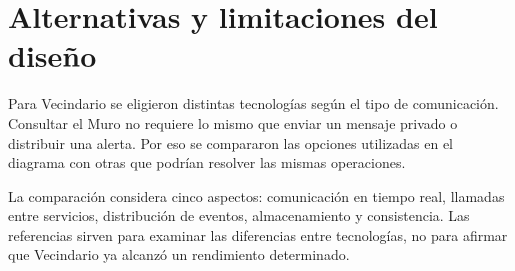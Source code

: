 \documentclass[12pt,a4paper]{article}
\begin{document}
\section{Alternativas y limitaciones del diseño}

Para Vecindario se eligieron distintas tecnologías según el tipo de
comunicación. Consultar el Muro no requiere lo mismo que enviar un
mensaje privado o distribuir una alerta. Por eso se compararon las
opciones utilizadas en el diagrama con otras que podrían resolver
las mismas operaciones.

La comparación considera cinco aspectos: comunicación en tiempo
real, llamadas entre servicios, distribución de eventos,
almacenamiento y consistencia. Las referencias sirven para
examinar las diferencias entre tecnologías, no para afirmar
que Vecindario ya alcanzó un rendimiento determinado.
\end{document}
